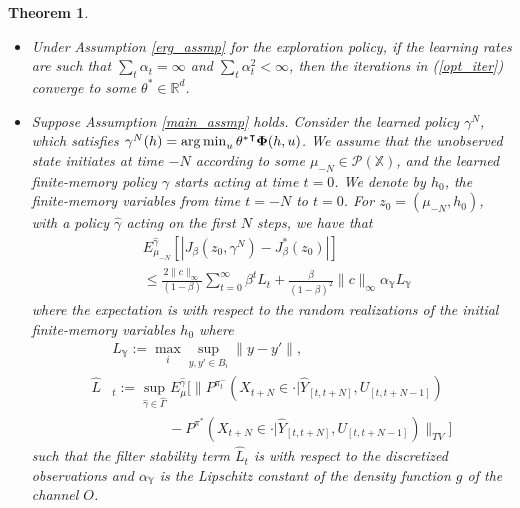 \documentclass[letterpaper, 10 pt, conference]{ieeeconf}  %
\def\argmin{\mathop{\rm arg\, min}}
\def\P{{\mathcal P}}
\newtheorem{theorem}{Theorem}
\theoremstyle{definition}
\theoremstyle{remark}
\begin{document}
\begin{theorem}
\begin{itemize}
\item
Under Assumption \ref{erg_assmp} for the exploration policy, if the learning rates are such that $\sum_t\alpha_t = \infty$ and $\sum_t \alpha_t^2<\infty$, then the iterations in (\ref{opt_iter}) converge to some $\theta^* \in\mathds{R}^d$.
\item
Suppose Assumption \ref{main_assmp} holds. Consider the learned policy $\gamma^N$, which satisfies $\gamma^N(h)=\argmin_u {\theta^*}^\intercal {\bf \Phi}(h,u)$. We assume that the unobserved state initiates at time $-N$ according to some $\mu_{-N}\in \P(\mathds{X})$, and the learned finite-memory policy $\gamma$ starts acting at time $t=0$. We denote by $h_0$, the finite-memory variables from time $t=-N$ to $t=0$. For ${z}_0=(\mu_{-N},h_0)$, with a policy $\hat{\gamma}$ acting on the first $N$ steps, we have that
\begin{align*}
&E_{\mu_{-N}}^{\hat{\gamma}}\left[\left|J_\beta({z}_0,{\gamma^N}) - J_\beta^*(z_0)\right|\right]\\
&\leq  \frac{2\|c\|_\infty }{(1-\beta)}\sum_{t=0}^\infty\beta^t\hat{L}_t + \frac{\beta}{(1-\beta)^2}\|c\|_\infty \alpha_{\mathds{Y}} L_\mathds{Y} \end{align*}
 where the expectation is with respect to the random realizations of the initial finite-memory variables $h_0$
where
\begin{align*}
 &L_{\mathds{Y}}:= \max_{i}\sup_{y,y'\in B_i}\|y-y'\|,\\
\hat{L}&_t:=\sup_{\hat{\gamma}\in\hat{\Gamma}}E_{\mu}^{\hat{\gamma}}\bigg[\|P^{\pi_t^-}(X_{t+N}\in\cdot|\hat{Y}_{[t,t+N]},U_{[t,t+N-1]})\nonumber\\
&\qquad\qquad-P^{\pi^*}(X_{t+N}\in\cdot|\hat{Y}_{[t,t+N]},U_{[t,t+N-1]})\|_{TV}\bigg]
\end{align*}
such that the filter stability term $\hat{L}_t$ is with respect to the discretized observations and $\alpha_{\mathds{Y}}$ is the Lipschitz constant of the density function $g$ of the channel $O$.
\end{itemize}
\end{theorem}









\end{document}
